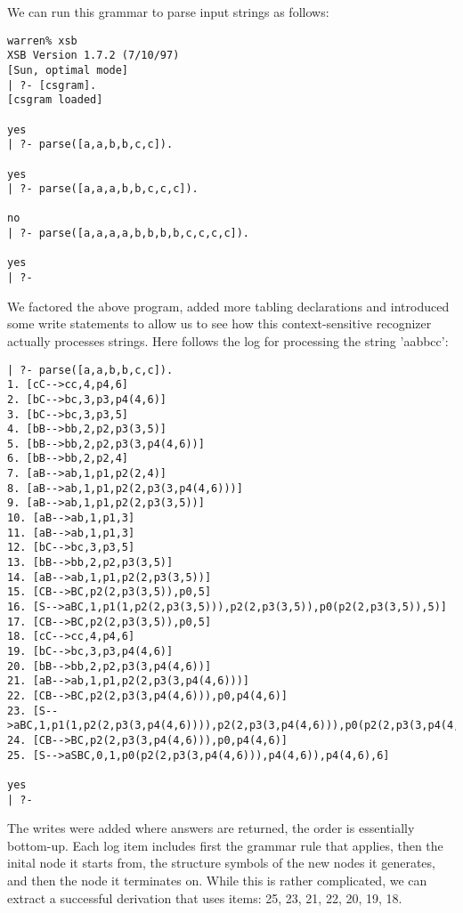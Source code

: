 We can run this grammar to parse input strings as follows:
\begin{verbatim}
warren% xsb
XSB Version 1.7.2 (7/10/97)
[Sun, optimal mode]
| ?- [csgram].
[csgram loaded]

yes
| ?- parse([a,a,b,b,c,c]).

yes
| ?- parse([a,a,a,b,b,c,c,c]).

no
| ?- parse([a,a,a,a,b,b,b,b,c,c,c,c]).

yes
| ?- 
\end{verbatim}

We factored the above program, added more tabling declarations and
introduced some write statements to allow us to see how this
context-sensitive recognizer actually processes strings.  Here follows
the log for processing the string 'aabbcc':
\begin{verbatim}
| ?- parse([a,a,b,b,c,c]).
1. [cC-->cc,4,p4,6]
2. [bC-->bc,3,p3,p4(4,6)]
3. [bC-->bc,3,p3,5]
4. [bB-->bb,2,p2,p3(3,5)]
5. [bB-->bb,2,p2,p3(3,p4(4,6))]
6. [bB-->bb,2,p2,4]
7. [aB-->ab,1,p1,p2(2,4)]
8. [aB-->ab,1,p1,p2(2,p3(3,p4(4,6)))]
9. [aB-->ab,1,p1,p2(2,p3(3,5))]
10. [aB-->ab,1,p1,3]
11. [aB-->ab,1,p1,3]
12. [bC-->bc,3,p3,5]
13. [bB-->bb,2,p2,p3(3,5)]
14. [aB-->ab,1,p1,p2(2,p3(3,5))]
15. [CB-->BC,p2(2,p3(3,5)),p0,5]
16. [S-->aBC,1,p1(1,p2(2,p3(3,5))),p2(2,p3(3,5)),p0(p2(2,p3(3,5)),5)]
17. [CB-->BC,p2(2,p3(3,5)),p0,5]
18. [cC-->cc,4,p4,6]
19. [bC-->bc,3,p3,p4(4,6)]
20. [bB-->bb,2,p2,p3(3,p4(4,6))]
21. [aB-->ab,1,p1,p2(2,p3(3,p4(4,6)))]
22. [CB-->BC,p2(2,p3(3,p4(4,6))),p0,p4(4,6)]
23. [S-->aBC,1,p1(1,p2(2,p3(3,p4(4,6)))),p2(2,p3(3,p4(4,6))),p0(p2(2,p3(3,p4(4,6))),p4(4,6))]
24. [CB-->BC,p2(2,p3(3,p4(4,6))),p0,p4(4,6)]
25. [S-->aSBC,0,1,p0(p2(2,p3(3,p4(4,6))),p4(4,6)),p4(4,6),6]

yes
| ?- 
\end{verbatim}
The writes were added where answers are returned, the order is
essentially bottom-up.  Each log item includes first the grammar rule
that applies, then the inital node it starts from, the structure
symbols of the new nodes it generates, and then the node it terminates
on.  While this is rather complicated, we can extract a successful
derivation that uses items: 25, 23, 21, 22, 20, 19, 18.

